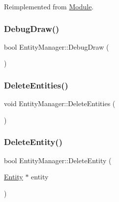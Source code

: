 Reimplemented from \mbox{\hyperlink{class_module_a77d7a006e42c0bd10110e1adbd4598cb}{Module}}.

\mbox{\label{class_entity_manager_a779c63016dbe34a2587838dba7011601}} 
\subsubsection{\texorpdfstring{DebugDraw()}{DebugDraw()}}
{\footnotesize\ttfamily bool Entity\+Manager\+::\+Debug\+Draw (\begin{DoxyParamCaption}{ }\end{DoxyParamCaption})}

\mbox{\label{class_entity_manager_af67721fd911b6284b3f8581a75dc8d64}} 
\subsubsection{\texorpdfstring{DeleteEntities()}{DeleteEntities()}}
{\footnotesize\ttfamily void Entity\+Manager\+::\+Delete\+Entities (\begin{DoxyParamCaption}{ }\end{DoxyParamCaption})}

\mbox{\label{class_entity_manager_a87f90f44445959b021c31d62506f1aa4}} 
\subsubsection{\texorpdfstring{DeleteEntity()}{DeleteEntity()}}
{\footnotesize\ttfamily bool Entity\+Manager\+::\+Delete\+Entity (\begin{DoxyParamCaption}\item[{\mbox{\hyperlink{class_entity}{Entity}} $\ast$}]{entity }\end{DoxyParamCaption})}

\mbox{\label{class_entity_manager_a14dcddc0ebfa5b4c4536e4d019d7ae07}} 
